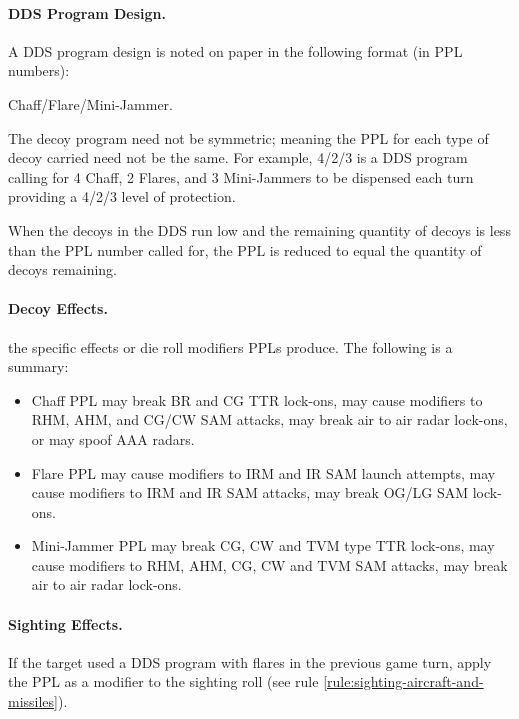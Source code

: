 \begin{advancedrules}
\paragraph{DDS Program Design.} A DDS program design is noted on paper in the following format (in PPL numbers): 
\begin{center}
    Chaff/Flare/Mini-Jammer. 
\end{center}
The decoy program need not be symmetric; meaning the PPL for each type of decoy carried need not be the same. For example, 4/2/3 is a DDS program calling for 4 Chaff, 2 Flares, and 3 Mini-Jammers to be dispensed each turn providing a 4/2/3 level of protection.

When the decoys in the DDS run low and the remaining quantity of decoys is less than the PPL number called for, the PPL is reduced to equal the quantity of decoys remaining.


\paragraph{Decoy Effects.}  the specific effects or die roll modifiers PPLs produce. The following is a summary:

\begin{itemize}

    \item Chaff PPL may break BR and CG TTR lock-ons, may cause modifiers to RHM, AHM, and CG/CW SAM attacks, may break air to air radar lock-ons, or may spoof AAA radars.

    \item Flare PPL may cause modifiers to IRM and IR SAM launch attempts, may cause modifiers to IRM and IR SAM attacks, may break OG/LG SAM lock-ons.

    \item Mini-Jammer PPL may break CG, CW and TVM type TTR lock-ons, may cause modifiers to RHM, AHM, CG, CW and TVM SAM attacks, may break air to air radar lock-ons.

\end{itemize}

\paragraph{Sighting Effects.} If the target used a DDS program with flares in the previous game turn, apply the PPL as a modifier to the sighting roll (see rule \ref{rule:sighting-aircraft-and-missiles}).



\end{advancedrules}
